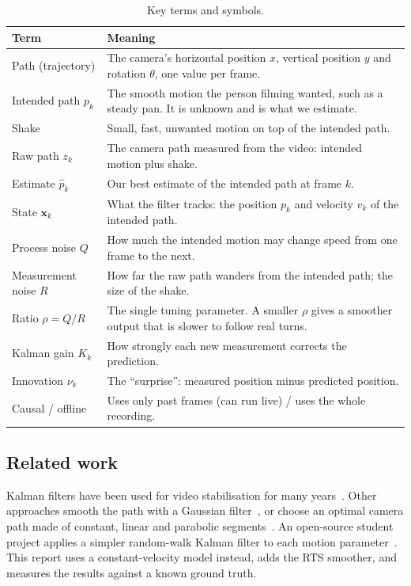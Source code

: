\documentclass[11pt,a4paper]{article}
\begin{document}
\begin{table}[htbp]
  \centering
  \small
  \caption{Key terms and symbols.}
  \label{tab:terms}
  \begin{tabularx}{\linewidth}{@{}lX@{}}
    \toprule
    Term & Meaning \\
    \midrule
    Path (trajectory) & The camera's horizontal position $x$, vertical position $y$ and
                        rotation $\theta$, one value per frame. \\
    Intended path $p_k$ & The smooth motion the person filming wanted, such as a steady pan.
                          It is unknown and is what we estimate. \\
    Shake & Small, fast, unwanted motion on top of the intended path. \\
    Raw path $z_k$ & The camera path measured from the video: intended motion plus shake. \\
    Estimate $\hat p_k$ & Our best estimate of the intended path at frame $k$. \\
    State $\mathbf{x}_k$ & What the filter tracks: the position $p_k$ and velocity $v_k$ of
                           the intended path. \\
    Process noise $Q$ & How much the intended motion may change speed from one frame to the
                        next. \\
    Measurement noise $R$ & How far the raw path wanders from the intended path; the size of
                            the shake. \\
    Ratio $\rho = Q/R$ & The single tuning parameter. A smaller $\rho$ gives a smoother output
                         that is slower to follow real turns. \\
    Kalman gain $K_k$ & How strongly each new measurement corrects the prediction. \\
    Innovation $\nu_k$ & The ``surprise'': measured position minus predicted position. \\
    Causal / offline & Uses only past frames (can run live) / uses the whole recording. \\
    \bottomrule
  \end{tabularx}
\end{table}

\subsection{Related work}
Kalman filters have been used for video stabilisation for many years~\cite{litvin2003}. Other
approaches smooth the path with a Gaussian filter~\cite{matsushita2006}, or choose an optimal
camera path made of constant, linear and parabolic segments~\cite{grundmann2011}. An
open-source student project applies a simpler random-walk Kalman filter to each motion
parameter~\cite{spoorthiuk}. This report uses a constant-velocity model instead, adds the RTS
smoother, and measures the results against a known ground truth.
\end{document}
